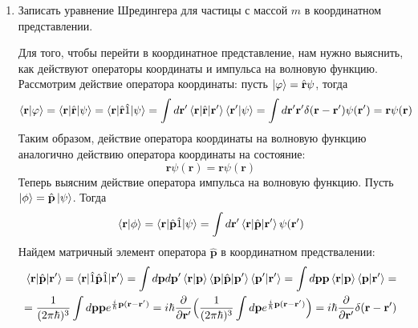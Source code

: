 \documentclass{article}
\begin{document}
\begin{enumerate}
	\item {Записать уравнение Шредингера для частицы с массой $m$ в координатном представлении.}
	
	Для того, чтобы перейти в координатное представление, нам нужно выяснить, как действуют операторы координаты и импульса на волновую функцию. Рассмотрим действие оператора координаты: пусть $\ket{\varphi} = \hat{\textbf{r}}\psi$, тогда
	\begin{equation}
		\braket{\textbf{r}|\varphi} = \braket{\textbf{r}|\hat{\textbf{r}}|\psi} = \braket{\textbf{r}|\hat{\textbf{r}}\hat{1}|\psi} = \int d\textbf{r}' \braket{\textbf{r}|\hat{\textbf{r}}|\textbf{r}'} \braket{\textbf{r}'|\psi} = \int d\textbf{r}' \textbf{r}' \delta(\textbf{r} - \textbf{r}') \psi(\textbf{r}') = \textbf{r}\psi(\textbf{r})
	\end{equation}
	Таким образом, действие оператора координаты на волновую функцию аналогично действию оператора координаты на состояние:
	\begin{equation}
		\hat{\textbf{r}}\psi(\textbf{r}) = \textbf{r} \psi(\textbf{r})
	\end{equation}
	Теперь выясним действие оператора импульса на волновую функцию. Пусть $\ket{\phi} = \hat{\textbf{p}}\ket{\psi}$. Тогда
	\begin{equation}
		\braket{\textbf{r}|\phi} = \braket{\textbf{r}|\hat{\textbf{p}}\hat{1}|\psi} = \int d\textbf{r}' \braket{\textbf{r}|\hat{\textbf{p}}|\textbf{r}'} \psi(\textbf{r}') \label{imulseFirst}
	\end{equation}
	Найдем матричный элемент оператора $\hat{\textbf{p}}$ в координатном предствалении:
	\begin{equation}
	\begin{split}
		\braket{\textbf{r}|\hat{\textbf{p}}|\textbf{r}'} = \braket{\textbf{r}|\hat{1}\hat{\textbf{p}}\hat{1}|\textbf{r}'} = \int d\textbf{p}d\textbf{p}'\braket{\textbf{r}|\textbf{p}} \braket{\textbf{p}|\hat{\textbf{p}}|\textbf{p}'} \braket{\textbf{p}'|\textbf{r}'} = \int d\textbf{p} \textbf{p} \braket{\textbf{r}|\textbf{p}} \braket{\textbf{p}|\textbf{r}'} =\\= \frac{1}{(2\pi\hbar)^3} \int d\textbf{p} \textbf{p} e^{\frac{i}{\hbar}\textbf{p}(\textbf{r} - \textbf{r}')} = i\hbar \frac{\partial}{\partial \textbf{r}'}\Big(\frac{1}{(2\pi\hbar)^3}\int d\textbf{p} e^{\frac{i}{\hbar}\textbf{p}(\textbf{r} - \textbf{r}')}  \Big) = i\hbar \frac{\partial}{\partial \textbf{r}'} \delta(\textbf{r} - \textbf{r}')
		\end{split}
	\end{equation}

\end{enumerate}
\end{document}
